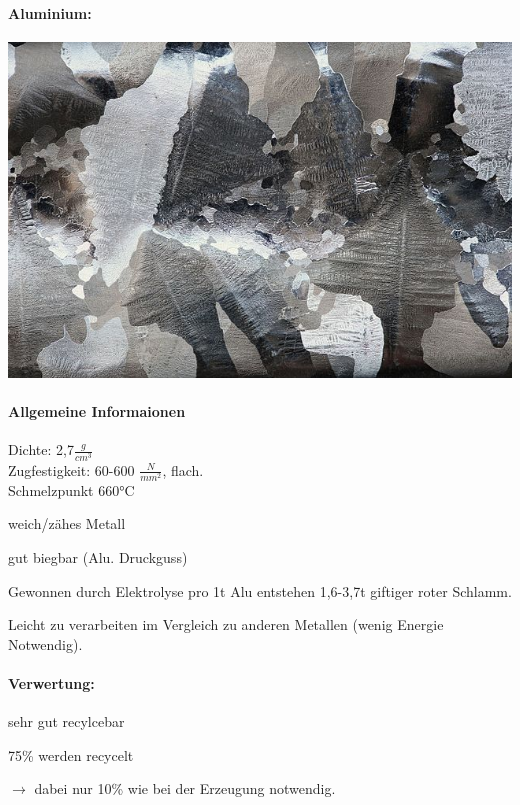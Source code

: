 \documentclass{article}
\begin{document}
\begin{multicols}{3}
\paragraph{Aluminium:}
\includegraphics[width=\linewidth]{alu.jpg}
\paragraph{Allgemeine Informaionen}
Dichte: 2,7$\frac{g}{cm^3}$\\
Zugfestigkeit: 60-600 $\frac{N}{mm^2}$, flach.\\
Schmelzpunkt 660°C
\begin{compactitem}
  \item weich/zähes Metall
  \item gut biegbar (Alu. Druckguss)
\end{compactitem}

Gewonnen durch Elektrolyse pro 1t Alu entstehen 1,6-3,7t giftiger roter Schlamm.

Leicht zu verarbeiten im Vergleich zu anderen Metallen (wenig Energie Notwendig).

\paragraph{Verwertung:}
\begin{compactitem}
  \item sehr gut recylcebar
  \item 75\% werden recycelt
  \item $\to$ dabei nur 10\% wie bei der Erzeugung notwendig.
\end{compactitem}


\end{multicols}
\end{document}
